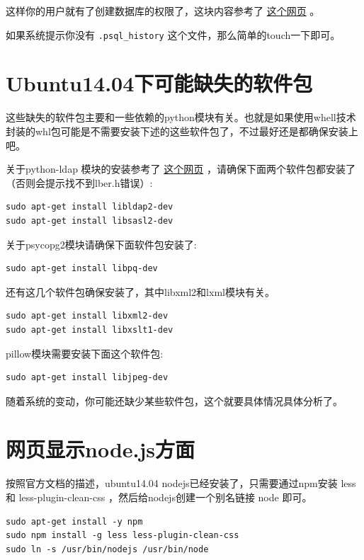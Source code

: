 \documentclass[11pt,a4paper]{sphinxmanual}
\begin{document}
这样你的用户就有了创建数据库的权限了，这块内容参考了 \href{http://dba.stackexchange.com/questions/33285/how-to-i-grant-a-user-account-permission-to-create-databases-in-postgresql}{这个网页} 。

如果系统提示你没有 \verb~.psql_history~ 这个文件，那么简单的touch一下即可。



\section{Ubuntu14.04下可能缺失的软件包}
\label{sec-3-2}
这些缺失的软件包主要和一些依赖的python模块有关。也就是如果使用whell技术封装的whl包可能是不需要安装下述的这些软件包了，不过最好还是都确保安装上吧。

关于python-ldap 模块的安装参考了 \href{http://stackoverflow.com/questions/4768446/python-cant-install-python-ldap}{这个网页} ，请确保下面两个软件包都安装了（否则会提示找不到lber.h错误）: 

\begin{Verbatim}
sudo apt-get install libldap2-dev 
sudo apt-get install libsasl2-dev
\end{Verbatim}

关于psycopg2模块请确保下面软件包安装了: 
\begin{Verbatim}
sudo apt-get install libpq-dev
\end{Verbatim}

还有这几个软件包确保安装了，其中libxml2和lxml模块有关。
\begin{Verbatim}
sudo apt-get install libxml2-dev
sudo apt-get install libxslt1-dev
\end{Verbatim}

pillow模块需要安装下面这个软件包:
\begin{Verbatim}
sudo apt-get install libjpeg-dev
\end{Verbatim}

随着系统的变动，你可能还缺少某些软件包，这个就要具体情况具体分析了。


\section{网页显示node.js方面}
\label{sec-3-3}
按照官方文档的描述，ubuntu14.04 nodejs已经安装了，只需要通过npm安装 less 和 less-plugin-clean-css ，然后给nodejs创建一个别名链接 node 即可。
\begin{Verbatim}
sudo apt-get install -y npm
sudo npm install -g less less-plugin-clean-css
sudo ln -s /usr/bin/nodejs /usr/bin/node
\end{Verbatim}
\end{document}
